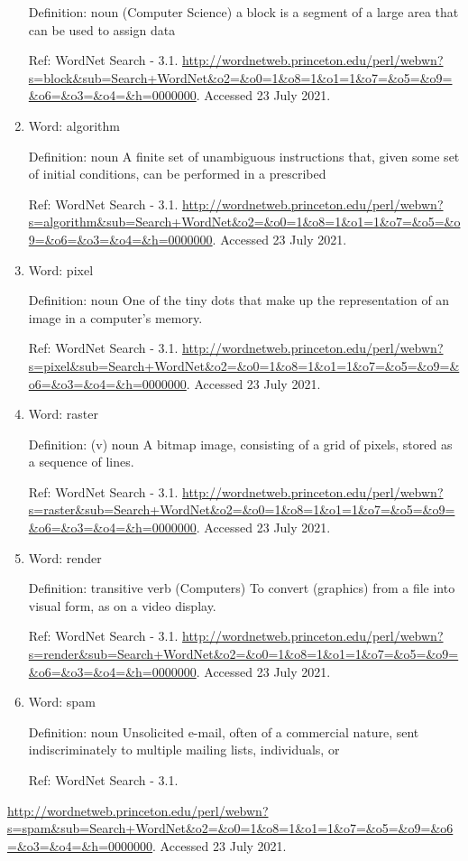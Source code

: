\documentclass{scrartcl}
\begin{document}
\begin{enumerate}
 Definition: noun (Computer Science) a block is a segment of a large area
that can be used to assign data

Ref: WordNet Search - 3.1. \url{http://wordnetweb.princeton.edu/perl/webwn?s=block\&sub=Search+WordNet\&o2=\&o0=1\&o8=1\&o1=1\&o7=\&o5=\&o9=\&o6=\&o3=\&o4=\&h=0000000}. Accessed 23 July 2021.

\item Word: algorithm

Definition:  noun   A finite set of unambiguous instructions that, given some set of initial conditions, can be performed in a prescribed

Ref: WordNet Search - 3.1. \url{http://wordnetweb.princeton.edu/perl/webwn?s=algorithm\&sub=Search+WordNet\&o2=\&o0=1\&o8=1\&o1=1\&o7=\&o5=\&o9=\&o6=\&o3=\&o4=\&h=0000000}. Accessed 23 July 2021.

\item Word: pixel

Definition:  noun   One of the tiny dots that make up the representation of an image in a computer's memory.

Ref: WordNet Search - 3.1. \url{http://wordnetweb.princeton.edu/perl/webwn?s=pixel\&sub=Search+WordNet\&o2=\&o0=1\&o8=1\&o1=1\&o7=\&o5=\&o9=\&o6=\&o3=\&o4=\&h=0000000}. Accessed 23 July 2021.

\item Word: raster

Definition: (v)  noun  A bitmap image, consisting of a grid of pixels, stored as a sequence of lines.

Ref: WordNet Search - 3.1. \url{http://wordnetweb.princeton.edu/perl/webwn?s=raster\&sub=Search+WordNet\&o2=\&o0=1\&o8=1\&o1=1\&o7=\&o5=\&o9=\&o6=\&o3=\&o4=\&h=0000000}. Accessed 23 July 2021.

\item Word: render

Definition: transitive verb (Computers)  To convert (graphics) from a file into visual form, as on a video display.

Ref: WordNet Search - 3.1. \url{http://wordnetweb.princeton.edu/perl/webwn?s=render\&sub=Search+WordNet\&o2=\&o0=1\&o8=1\&o1=1\&o7=\&o5=\&o9=\&o6=\&o3=\&o4=\&h=0000000}. Accessed 23 July 2021.

\item Word: spam

Definition:  noun   Unsolicited e-mail, often of a commercial nature, sent indiscriminately to multiple mailing lists, individuals, or

Ref: WordNet Search - 3.1.
\end{enumerate}
\url{http://wordnetweb.princeton.edu/perl/webwn?s=spam\&sub=Search+WordNet\&o2=\&o0=1\&o8=1\&o1=1\&o7=\&o5=\&o9=\&o6=\&o3=\&o4=\&h=0000000}. Accessed 23 July 2021.
\end{document}
